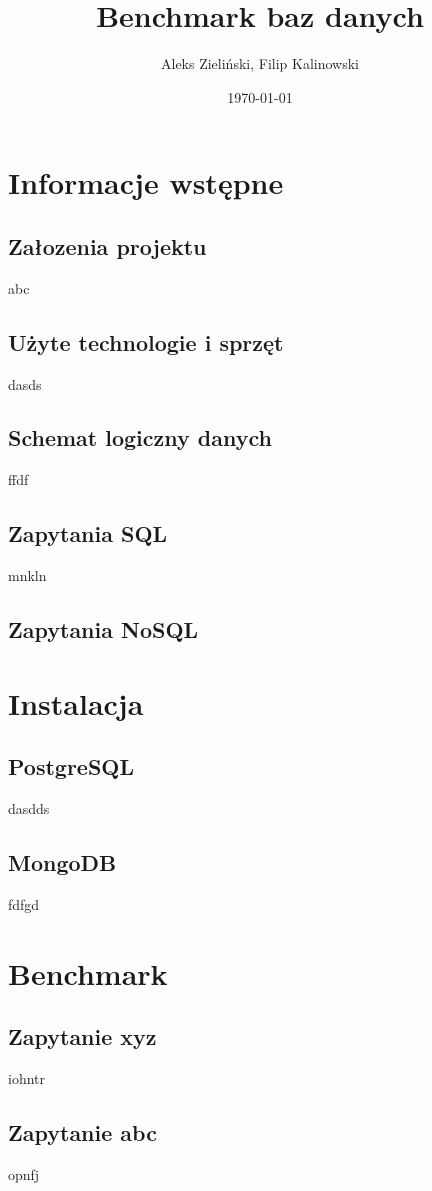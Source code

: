 \documentclass[11pt]{article}
\title{\textbf{Benchmark baz danych}}
\author{Aleks Zieliński, Filip Kalinowski}
\date{\today}
\begin{document}
\maketitle
\tableofcontents

\section{Informacje wstępne}
        \subsection{Załozenia projektu}
                abc
        \subsection{Użyte technologie i sprzęt}
                dasds
        \subsection{Schemat logiczny danych}
                ffdf
        \subsection{Zapytania SQL}
                mnkln
        \subsection{Zapytania NoSQL}
\section{Instalacja}
        \subsection{PostgreSQL}
                dasdds
        \subsection{MongoDB}
                fdfgd
\section{Benchmark}
        \subsection{Zapytanie xyz}
                iohntr
        \subsection{Zapytanie abc}
                opnfj
\end{document}
